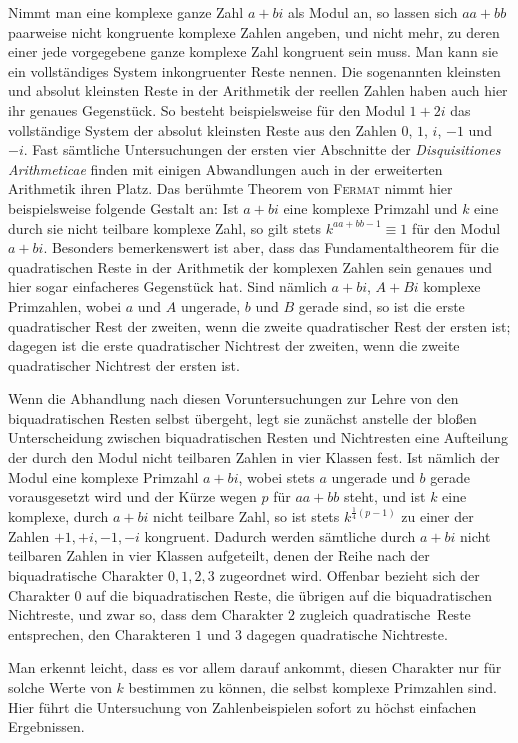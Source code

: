 Nimmt man eine komplexe ganze Zahl $a+bi$ als Modul an, so lassen sich $aa+bb$ paarweise nicht kongruente komplexe Zahlen angeben, und nicht mehr, zu deren einer jede vorgegebene ganze komplexe Zahl kongruent sein muss. Man kann sie ein vollständiges System inkongruenter Reste nennen. Die sogenannten kleinsten und absolut kleinsten Reste in der Arithmetik der reellen Zahlen haben auch hier ihr genaues Gegenstück. So besteht beispielsweise für den Modul $1+2i$ das vollständige System der absolut kleinsten Reste aus den Zahlen $0$, $1$, $i$, $-1$ und $-i$. Fast sämtliche Untersuchungen der ersten vier Abschnitte der \emph{Disquisitiones Arithmeticae} finden mit einigen Abwandlungen auch in der erweiterten Arithmetik ihren Platz. Das berühmte Theorem von \textsc{Fermat} nimmt hier beispielsweise folgende Gestalt an: Ist $a+bi$ eine komplexe Primzahl und $k$ eine durch sie nicht teilbare komplexe Zahl, so gilt stets $k^{aa+bb-1}\equiv1$ für den Modul $a+bi$. Besonders bemerkenswert ist aber, dass das Fundamentaltheorem für die quadratischen Reste in der Arithmetik der komplexen Zahlen sein genaues und hier sogar einfacheres Gegenstück hat. Sind nämlich $a+bi$, $A+Bi$ komplexe Primzahlen, wobei $a$ und $A$ ungerade, $b$ und $B$ gerade sind, so ist die erste quadratischer Rest der zweiten, wenn die zweite quadratischer Rest der ersten ist; dagegen ist die erste quadratischer Nichtrest der zweiten, wenn die zweite quadratischer Nichtrest der ersten ist.

Wenn die Abhandlung nach diesen Voruntersuchungen zur Lehre von den biquadratischen Resten selbst übergeht, legt sie zunächst anstelle der bloßen Unterscheidung zwischen biquadratischen Resten und Nichtresten eine Aufteilung der durch den Modul nicht teilbaren Zahlen in vier Klassen fest. Ist nämlich der Modul eine komplexe Primzahl $a+bi$, wobei stets $a$ ungerade und $b$ gerade vorausgesetzt wird und der Kürze wegen $p$ für $aa+bb$ steht, und ist $k$ eine komplexe, durch $a+bi$ nicht teilbare Zahl, so ist stets $k^{\frac14(p-1)}$
zu einer der Zahlen $+1,+i,-1,-i$ kongruent. Dadurch werden sämtliche durch $a+bi$ nicht teilbaren Zahlen in vier Klassen aufgeteilt, denen der Reihe nach der biquadratische Charakter $0,1,2,3$ zugeordnet wird. Offenbar bezieht sich der Charakter $0$ auf die biquadratischen Reste, die übrigen auf die biquadratischen Nichtreste, und zwar so, dass dem Charakter $2$ zugleich quadratische\textperiodcentered\ Reste entsprechen, den Charakteren $1$ und $3$ dagegen quadratische Nichtreste.

Man erkennt leicht, dass es vor allem darauf ankommt, diesen Charakter nur für solche Werte von $k$ bestimmen zu können, die selbst komplexe Primzahlen sind. Hier führt die Untersuchung von Zahlenbeispielen sofort zu höchst einfachen Ergebnissen.

